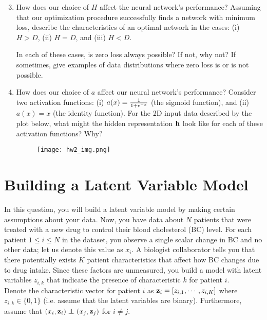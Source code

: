 \documentclass[11pt]{article}
\begin{document}
\begin{enumerate}[label=(\Alph*)]
\setcounter{enumi}{2}
    
    \item How does our choice of $H$ affect the neural network's performance? Assuming that our optimization procedure successfully finds a network with minimum loss, describe the characteristics of an optimal network in the cases: (i) $H > D$, (ii) $H = D$, and (iii) $H < D$.
    
    In each of these cases, is zero loss always possible? If not, why not? If sometimes, give examples of data distributions where zero loss is or is not possible. 
    
    
    \item How does our choice of $a$ affect our neural network's performance? Consider two activation functions: (i) $a(x) = \frac{1}{1 + \epsilon^{-x}}$ (the sigmoid function), and (ii) $a(x) = x$ (the identity function). For the 2D input data described by the plot below, what might the hidden representation ${\mathbf h}$ look like for each of these activation functions? Why?
    
    \begin{figure}[h!]
        \centering
        \texttt{[image: hw2\_img.png]}
    \end{figure}
    
\end{enumerate}

\newpage


\section{Building a Latent Variable Model} 

In this question, you will build a latent variable model by making certain assumptions about your data. Now, you have data about $N$ patients that were treated with a new drug to control their blood cholesterol (BC) level. For each patient $1 \leq i \leq N$ in the dataset, you observe a single scalar change in BC and no other data; let us denote this value as $x_i$. A biologist collaborator tells you that there potentially exists $K$ patient characteristics that affect how BC changes due to drug intake. Since these factors are unmeasured, you build a model with latent variables $z_{i,k}$ that indicate the presence of characteristic $k$ for patient $i$.\\

\noindent Denote the characteristic vector for patient $i$ as ${\mathbf z}_i = [z_{i,1}, \cdots ,z_{i, K}]$ where $z_{i,k} \in \{0, 1\}$ (i.e. assume that the latent variables are binary). Furthermore, assume that $(x_i, \bz_i) \indep (x_j, \bz_j)$ for $i\not=j$.
\end{document}
